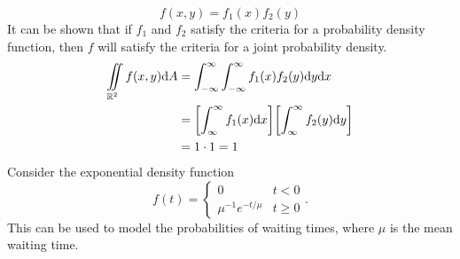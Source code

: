\[ f(x,y) = f_1(x)f_2(y) \]
It can be shown that if $f_1$ and $f_2$ satisfy the criteria for a probability density function, then $f$ will satisfy the criteria for a joint probability density.
\begin{align*}
    \iint\limits_{\RR^2} f(x,y)\dd A &= \int_{-\infty}^{\infty}\int_{-\infty}^{\infty}f_1(x)f_2(y)\dd y\dd x \\
    &= \bqty{\int_{\infty}^\infty f_1(x)\dd x}\bqty{\int_{\infty}^\infty f_2(y)\dd y} \\
    &= 1\cdot 1 = 1
\end{align*}
Consider the exponential density function
\[ f(t) = \begin{cases}
    0 & t < 0 \\
    \mu^{-1}e^{-t/\mu} & t\geq 0
\end{cases}. \]
This can be used to model the probabilities of waiting times, where $\mu$ is the mean waiting time.
